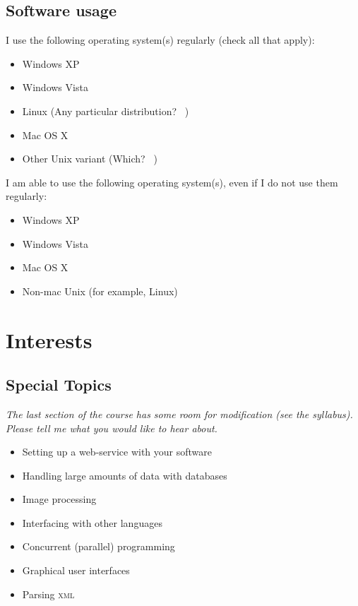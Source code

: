 \documentclass[article,twoside]{memoir}
\newcommand*{\fillunderscore}{~\hrulefill}
\newcommand*{\checkbox}{$\square$}
\newcommand{\header}[1]{\textsl{#1}}
\begin{document}
\section{Software usage}

I use the following operating system(s) regularly (check all that apply):
\begin{itemize}[\checkbox]
\item Windows XP
\item Windows Vista
\item Linux (Any particular distribution? \fillunderscore)
\item Mac OS X
\item Other Unix variant (Which? \fillunderscore)
\end{itemize}

\medskip

I am able to use the following operating system(s), even if I do not use them regularly:
\begin{itemize}[\checkbox]
\item Windows XP
\item Windows Vista
\item Mac OS X
\item Non-mac Unix (for example, Linux)
\end{itemize}

\chapter{Interests}

\section{Special Topics}

\header{The last section of the course has some room for modification (see the syllabus). Please tell me what you would like to hear about.}

\begin{itemize}[\checkbox]
\item Setting up a web-service with your software
\item Handling large amounts of data with databases
\item Image processing
\item Interfacing with other languages
\item Concurrent (parallel) programming
\item Graphical user interfaces
\item Parsing \textsc{xml}
\end{itemize}
\end{document}
